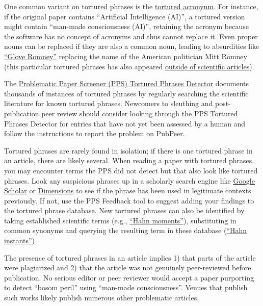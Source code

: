 \documentclass[letterpaper, 12pt]{article}
\begin{document}
One common variant on tortured phrases is the \href{10.1126/science.znqe1aq}{tortured acronynm}.
For instance, if the original paper contains ``Artificial Intelligence (AI)'',
a tortured version might contain ``man-made consciousness (AI)'',
retaining the acronym because the software has no concept of acronyms and thus cannot replace it.
Even proper nouns can be replaced if they are also a common noun, leading to absurdities like \href{https://pubpeer.com/publications/059D502827972226591FC5F5421221}{``Glove Romney''} replacing the name of the American politician Mitt Romney (this particular tortured phrases has also appeared \href{https://web.archive.org/web/20250322132615/https://www.amazon.com/Mitt-Romney-Biography-Book-Flexibility-ebook/dp/B0CLKZKKQG}{outside of scientific articles}).

The \href{https://www.irit.fr/~Guillaume.Cabanac/problematic-paper-screener}{Problematic Paper Screener (PPS) Tortured Phrases Detector} documents thousands of instances of tortured phrases by regularly searching the scientific literature for known tortured phrases.
Newcomers to sleuthing and post-publication peer review should consider looking through the PPS Tortured Phrases Detector for entries that have not yet been assessed by a human and follow the instructions to report the problem on PubPeer.

Tortured phrases are rarely found in isolation; if there is one tortured phrase in an article, there are likely several. When reading a paper with tortured phrases, you may encounter terms the PPS did not detect but that also look like tortured phrases. Look any suspicious phrases up in a scholarly search engine like \href{https://scholar.google.com}{Google Scholar} or \href{https://www.dimensions.ai/}{Dimensions} to see if the phrase has been used in legitimate contexts previously. If not, use the PPS Feedback tool to suggest adding your findings to the tortured phrase database. New tortured phrases can also be identified by taking established scientific terms (e.g., \href{https://doi.org/10.1007/11559573_65}{``Hahn moments''}), substituting in common synonyms and querying the resulting term in these database (\href{https://pubpeer.com/search?q=%22Hahn%20instants%22}{``Hahn instants''})

The presence of tortured phrases in an article implies 1) that parts of the article were plagiarized and 2) that the article was not genuinely peer-reviewed before publication.
No serious editor or peer reviewer would accept a paper purporting to detect ``bosom peril'' using ``man-made consciousness''.
Venues that publish such works likely publish numerous other problematic articles.
\end{document}
